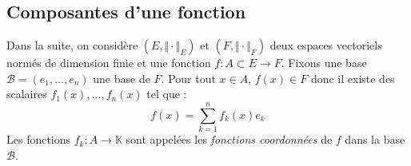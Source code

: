 \documentclass[french,11pt,twoside]{VcCours}
\begin{document}
%
%
%
%
%

\subsection{Composantes d'une fonction}

Dans la suite, on considère $(E, \Vert \cdot \Vert_E)$ et $(F, \Vert \cdot \Vert_F)$ deux espaces vectoriels normés de dimension finie et une fonction $f : A \subset E \rightarrow F$. Fixons une base $\mathcal{B}=(e_1, \ldots, e_n)$ une base de $F$. Pour tout $x \in A$, $f(x) \in F$ donc il existe des scalaires $f_1(x), \ldots, f_n(x)$ tel que :
 $$ f(x) = \sum_{k=1}^n f_k(x) e_k$$
Les fonctions $f_k : A \rightarrow \mathbb{K}$ sont appelées les \emph{fonctions coordonnées} de $f$ dans la base $\mathcal{B}$.
\end{document}
